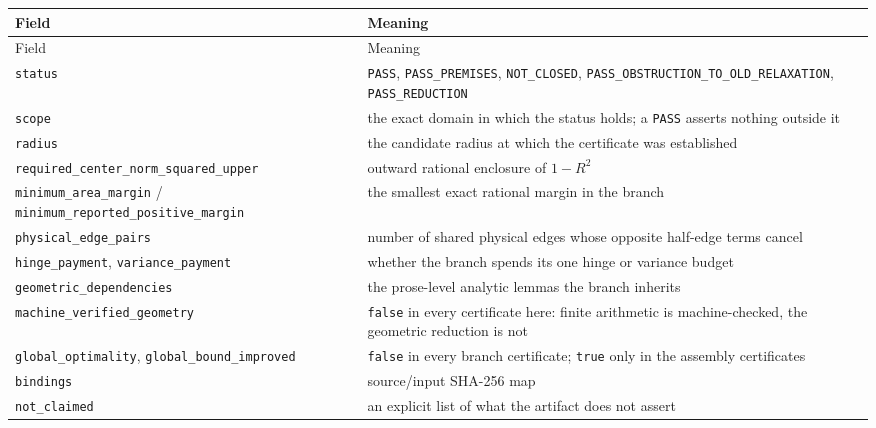 {\footnotesize
\begin{longtable}{@{}@{}>{\raggedright\arraybackslash}p{}>{\raggedright\arraybackslash}p{}@{}}
\toprule
Field & Meaning \\
\midrule
\endfirsthead
\toprule
Field & Meaning \\
\midrule
\endhead
\bottomrule
\endlastfoot
\texttt{status} & \texttt{PASS}, \texttt{PASS\_\allowbreak{}PREMISES}, \texttt{NOT\_\allowbreak{}CLOSED},
\texttt{PASS\_\allowbreak{}OBSTRUCTION\_\allowbreak{}TO\_\allowbreak{}OLD\_\allowbreak{}RELAXATION}, \texttt{PASS\_\allowbreak{}REDUCTION} \\
\texttt{scope} & the exact domain in which the status holds; a \texttt{PASS} asserts nothing outside
it \\
\texttt{radius} & the candidate radius at which the certificate was established \\
\texttt{required\_\allowbreak{}center\_\allowbreak{}norm\_\allowbreak{}squared\_\allowbreak{}upper} & outward rational enclosure of $1-R^2$ \\
\texttt{minimum\_\allowbreak{}area\_\allowbreak{}margin} / \texttt{minimum\_\allowbreak{}reported\_\allowbreak{}positive\_\allowbreak{}margin} & the smallest exact
rational margin in the branch \\
\texttt{physical\_\allowbreak{}edge\_\allowbreak{}pairs} & number of shared physical edges whose opposite half-edge terms
cancel \\
\texttt{hinge\_\allowbreak{}payment}, \texttt{variance\_\allowbreak{}payment} & whether the branch spends its one hinge or
variance budget \\
\texttt{geometric\_\allowbreak{}dependencies} & the prose-level analytic lemmas the branch inherits \\
\texttt{machine\_\allowbreak{}verified\_\allowbreak{}geometry} & \texttt{false} in every certificate here: finite arithmetic is
machine-checked, the geometric reduction is not \\
\texttt{global\_\allowbreak{}optimality}, \texttt{global\_\allowbreak{}bound\_\allowbreak{}improved} & \texttt{false} in every branch
certificate; \texttt{true} only in the assembly certificates \\
\texttt{bindings} & source/input SHA-256 map \\
\texttt{not\_\allowbreak{}claimed} & an explicit list of what the artifact does not assert \\
\end{longtable}}



